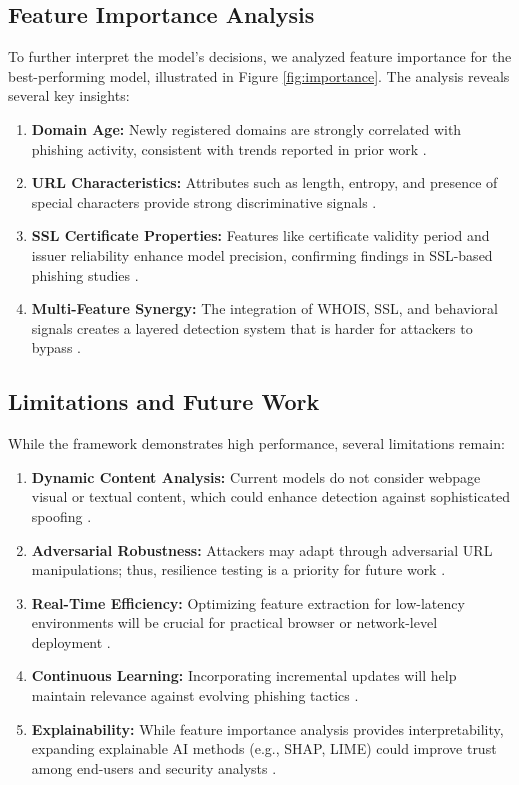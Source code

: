 \documentclass[conference]{IEEEtran}
\begin{document}
\subsection{Feature Importance Analysis}
To further interpret the model's decisions, we analyzed feature importance for the best-performing model, illustrated in Figure \ref{fig:importance}. The analysis reveals several key insights:

\begin{enumerate}
    \item \textbf{Domain Age:} Newly registered domains are strongly correlated with phishing activity, consistent with trends reported in prior work \cite{systlitchange2023, arxiv2024featureimportance}.
    \item \textbf{URL Characteristics:} Attributes such as length, entropy, and presence of special characters provide strong discriminative signals \cite{futureinternet2022behavior}.
    \item \textbf{SSL Certificate Properties:} Features like certificate validity period and issuer reliability enhance model precision, confirming findings in SSL-based phishing studies \cite{mdpi2023deeplearning}.
    \item \textbf{Multi-Feature Synergy:} The integration of WHOIS, SSL, and behavioral signals creates a layered detection system that is harder for attackers to bypass \cite{frontiers2025multimodal}.
\end{enumerate}

\subsection{Limitations and Future Work}
While the framework demonstrates high performance, several limitations remain:

\begin{enumerate}
    \item \textbf{Dynamic Content Analysis:} Current models do not consider webpage visual or textual content, which could enhance detection against sophisticated spoofing \cite{academia2021urltran}.
    \item \textbf{Adversarial Robustness:} Attackers may adapt through adversarial URL manipulations; thus, resilience testing is a priority for future work \cite{wikipedia2025adversarial, wired2021aipishing}.
    \item \textbf{Real-Time Efficiency:} Optimizing feature extraction for low-latency environments will be crucial for practical browser or network-level deployment \cite{mdpi2022improved}.
    \item \textbf{Continuous Learning:} Incorporating incremental updates will help maintain relevance against evolving phishing tactics \cite{wired2018ai}.
    \item \textbf{Explainability:} While feature importance analysis provides interpretability, expanding explainable AI methods (e.g., SHAP, LIME) could improve trust among end-users and security analysts \cite{wiley2022explainable, arxiv2024featureimportance}.
\end{enumerate}
\end{document}
